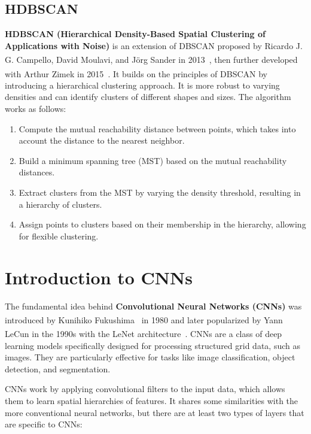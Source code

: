 \subsection*{HDBSCAN}
\label{subsec:hdbscan}

\textbf{HDBSCAN (Hierarchical Density-Based Spatial Clustering of Applications with Noise)} is an extension of DBSCAN
proposed by Ricardo J. G. Campello, David Moulavi, and Jörg Sander in 2013~\textsuperscript{\cite{Campello-et-al-2013}},
then further developed with Arthur Zimek in 2015~\textsuperscript{\cite{Campello-et-al-2015}}. It builds on the principles
of DBSCAN by introducing a hierarchical clustering approach. It is more robust to varying densities and can identify clusters
of different shapes and sizes. The algorithm works as follows:

\begin{enumerate}
	\item Compute the mutual reachability distance between points, which takes into account the distance to the nearest neighbor.
	\item Build a minimum spanning tree (MST) based on the mutual reachability distances.
	\item Extract clusters from the MST by varying the density threshold, resulting in a hierarchy of clusters.
	\item Assign points to clusters based on their membership in the hierarchy, allowing for flexible clustering.
\end{enumerate}

\section{Introduction to CNNs}
\label{sec:intro_cnn}

The fundamental idea behind \textbf{Convolutional Neural Networks (CNNs)} was introduced by Kunihiko Fukushima~\textsuperscript{\cite{Fukushima-1987}}
in 1980 and later popularized by Yann LeCun in the 1990s with the LeNet architecture~\textsuperscript{\cite{Lecun-et-al-1998}}. CNNs are a class of
deep learning models specifically designed for processing structured grid data, such as images. They are particularly effective for
tasks like image classification, object detection, and segmentation.

CNNs work by applying convolutional filters to the input data, which allows them to learn spatial hierarchies of features.
It shares some similarities with the more conventional neural networks, but there are at least two types of layers that are specific to CNNs:

